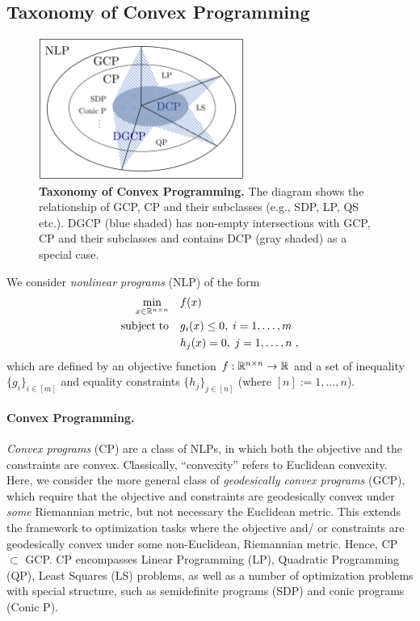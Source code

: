 \documentclass[twoside,11pt]{article}
\begin{document}
\subsection{Taxonomy of Convex Programming}
%
\begin{figure}[t]
    \centering
\includegraphics[width=0.6\textwidth]{figures/taxonomy.png}
    \caption{\textbf{Taxonomy of Convex Programming.}
     The diagram shows the relationship of GCP, CP and their subclasses (e.g., SDP, LP, QS etc.). DGCP (blue shaded) has non-empty intersections with GCP, CP and their subclasses and contains DCP (gray shaded) as a special case.
    }

    \label{fig:taxonomy}
\end{figure}
%
We consider \emph{nonlinear programs} (NLP) of the form
\begin{align}\label{eq:nlp}
    \min_{x \in \mathbb{R}^{n \times n}} \quad &f(x) \\
    {\rm subject \; to} \quad &g_i(x) \leq 0, \; i=1,\dots,m \nonumber \\
    &h_j(x) = 0, \; j=1,\dots,n \; ,\nonumber
\end{align}
which are defined by an objective function $f: \mathbb{R}^{n \times n} \rightarrow \mathbb{R}$ and a set of inequality $\{g_i\}_{i \in [m]}$ and equality constraints $\{h_j\}_{j \in [n]}$ (where $[n]:=1, \dots, n$). 

\paragraph{Convex Programming.} \emph{Convex programs} (CP) are a class of NLPs, in which both the objective and the constraints are convex. Classically, ``convexity'' refers to Euclidean convexity. Here, we consider the more general class of \emph{geodesically convex programs} (GCP), which require that the objective and constraints are geodesically convex under \emph{some} Riemannian metric, but not necessary the Euclidean metric. This extends the framework to optimization tasks where the objective and/ or constraints are geodesically convex under some non-Euclidean, Riemannian metric.
Hence, CP $\subset$ GCP. CP encompasses Linear Programming (LP), Quadratic Programming (QP), Least Squares (LS) problems, as well as a number of optimization problems with special structure, such as semidefinite programs (SDP) and conic programs (Conic P). 
\end{document}
